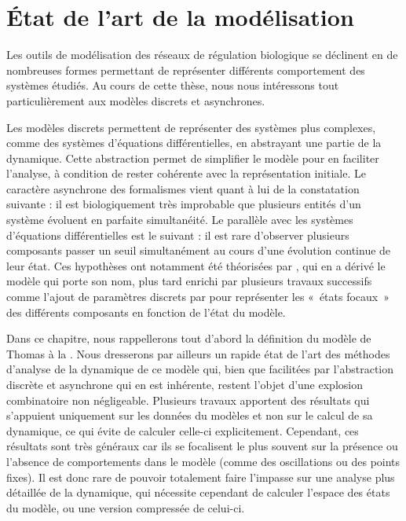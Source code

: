 
\chapter{État de l'art de la modélisation}




Les outils de modélisation des réseaux de régulation biologique se déclinent en de nombreuses
formes permettant de représenter différents comportement des systèmes étudiés.
Au cours de cette thèse, nous nous intéressons tout particulièrement aux modèles discrets
et asynchrones.

Les modèles discrets permettent de représenter des systèmes plus complexes,
comme des systèmes d'équations différentielles,
en abstrayant une partie de la dynamique.
Cette abstraction permet de simplifier le modèle pour en faciliter l'analyse,
à condition de rester cohérente avec la représentation initiale.
Le caractère asynchrone des formalismes vient quant à lui de la constatation suivante :
il est biologiquement très improbable que plusieurs entités d'un système
évoluent en parfaite simultanéité.
Le parallèle avec les systèmes d'équations différentielles est le suivant :
il est rare d'observer plusieurs composants passer un seuil simultanément
au cours d'une évolution continue de leur état.
Ces hypothèses ont notamment été théorisées par ,
qui en a dérivé le modèle qui porte son nom,
plus tard enrichi par plusieurs travaux successifs
comme l'ajout de paramètres discrets par 
pour représenter les «~états focaux~» des différents
composants en fonction de l'état du modèle.

Dans ce chapitre, nous rappellerons tout d'abord la définition du modèle de Thomas
à la .
Nous dresserons par ailleurs un rapide état de l'art des méthodes d'analyse
de la dynamique de ce modèle qui, bien que facilitées par
l'abstraction discrète et asynchrone qui en est inhérente,
restent l'objet d'une explosion combinatoire non négligeable.
Plusieurs travaux apportent des résultats qui s'appuient uniquement sur les données
du modèles et non sur le calcul de sa dynamique,
ce qui évite de calculer celle-ci explicitement.
Cependant, ces résultats sont très généraux
car ils se focalisent le plus souvent sur la présence ou l'absence de comportements
dans le modèle (comme des oscillations ou des points fixes).
Il est donc rare de pouvoir totalement faire l'impasse
sur une analyse plus détaillée de la dynamique,
qui nécessite cependant de calculer l'espace des états du modèle,
ou une version compressée de celui-ci.

